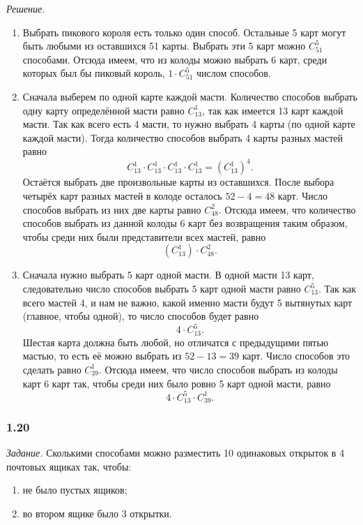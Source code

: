\textit{Решение.}
\begin{enumerate}[label=\alph*)]
\item Выбрать пикового короля есть только один способ.
Остальные 5 карт могут быть любыми из оставшихся 51 карты.
Выбрать эти 5 карт можно $ C_{51}^5 $ способами.
Отсюда имеем, что из колоды можно выбрать 6 карт, среди которых был бы пиковый король, $ 1 \cdot C_{51}^5 $ числом способов.

\item Сначала выберем по одной карте каждой масти.
Количество способов выбрать одну карту определённой масти равно $C_{13}^1$, так как имеется 13 карт каждой масти.
Так как всего есть 4 масти, то нужно выбрать 4 карты (по одной карте каждой масти).
Тогда количество способов выбрать 4 карты разных мастей равно
$$ C_{13}^1 \cdot C_{13}^1 \cdot C_{13}^1 \cdot C_{13}^1 =
\left( C_{13}^1 \right)^4.$$
Остаётся выбрать две произвольные карты из оставшихся.
После выбора четырёх карт разных мастей в колоде осталось $ 52 - 4 = 48 $ карт.
Число способов выбрать из них две карты равно $ C_{48}^2 $.
Отсюда имеем, что количество способов выбрать из данной колоды 6 карт без возвращения таким образом, чтобы среди них были представители всех мастей, равно
$$ \left( C_{13}^1 \right) \cdot C_{48}^2.$$

\item Сначала нужно выбрать 5 карт одной масти.
В одной масти 13 карт, следовательно число способов выбрать 5 карт одной масти равно $ C_{13}^5 $.
Так как всего мастей 4, и нам не важно, какой именно масти будут 5 вытянутых карт (главное, чтобы одной), то число способов будет равно
$$ 4 \cdot C_{13}^5.$$
Шестая карта должна быть любой, но отличатся с предыдущими пятью мастью, то есть её можно выбрать из $ 52 - 13 = 39 $ карт.
Число способов это сделать равно $ C_{39}^1 $.
Отсюда имеем, что число способов выбрать из колоды карт 6 карт так, чтобы среди них было ровно 5 карт одной масти, равно
$$ 4 \cdot C_{13}^5 \cdot C_{39}^1.$$
\end{enumerate}

\subsubsection*{1.20}

\textit{Задание.} Сколькими способами можно разместить 10 одинаковых открыток в 4 почтовых ящиках так, чтобы:
\begin{enumerate}[label=\alph*)]
\item не было пустых ящиков;
\item во втором ящике было 3 открытки.
\end{enumerate}

